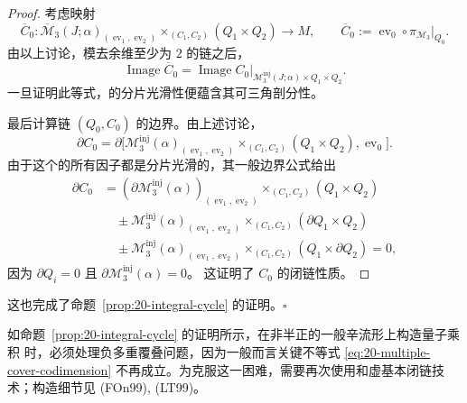 \begin{proof}
考虑映射
\[
 \overline C_0:\overline{\mathcal M}_3(J;\alpha)_{(\operatorname{ev}_1,\operatorname{ev}_2)}
 \times_{(C_1,C_2)}(Q_1\times Q_2)\to M,
 \qquad \overline C_0:=\operatorname{ev}_0\circ\pi_{\mathcal M_3}|_{Q_0}.
\]
由以上讨论，模去余维至少为 $2$ 的链之后，
\begin{equation}
 \operatorname{Image}\overline C_0
 =\operatorname{Image}C_0|_{\mathcal M_3^{\mathrm{inj}}(J;\alpha)\times Q_1\times Q_2}.
 \label{eq:20-image-c0}
\end{equation}
一旦证明此等式，\termFiberProduct{}的分片光滑性便蕴含其可三角剖分性。

最后计算链 $(Q_0,C_0)$ 的边界。由上述讨论，
\[
 \partial C_0=\partial\bigl[
 \mathcal M_3^{\mathrm{inj}}(\alpha)_{(\operatorname{ev}_1,\operatorname{ev}_2)}
 \times_{(C_1,C_2)}(Q_1\times Q_2),\operatorname{ev}_0\bigr].
\]
由于这个\termFiberProduct{}的所有因子都是分片光滑的，其一般边界公式给出
\begin{align*}
 \partial C_0
 &=(\partial\mathcal M_3^{\mathrm{inj}}(\alpha))_{(\operatorname{ev}_1,\operatorname{ev}_2)}
 \times_{(C_1,C_2)}(Q_1\times Q_2)\\
 &\quad\pm\mathcal M_3^{\mathrm{inj}}(\alpha)_{(\operatorname{ev}_1,\operatorname{ev}_2)}
 \times_{(C_1,C_2)}(\partial Q_1\times Q_2)\\
 &\quad\pm\mathcal M_3^{\mathrm{inj}}(\alpha)_{(\operatorname{ev}_1,\operatorname{ev}_2)}
 \times_{(C_1,C_2)}(Q_1\times\partial Q_2)=0,
\end{align*}
因为 $\partial Q_i=0$ 且 $\partial\mathcal M_3^{\mathrm{inj}}(\alpha)=0$。
这证明了 $C_0$ 的闭链性质。
\end{proof}

这也完成了命题~\ref{prop:20-integral-cycle} 的证明。\hfill$\square$

\begin{remark}
\label{rem:20-general-quantum-product}
如命题~\ref{prop:20-integral-cycle} 的证明所示，在非半正的一般辛流形上构造量子乘积
时，必须处理负多重覆叠问题，因为一般而言关键不等式
\eqref{eq:20-multiple-cover-codimension} 不再成立。为克服这一困难，需要再次使用\termKuranishiStructure{}和虚基本闭链技术；构造细节见 (FOn99), (LT99)。
\end{remark}
